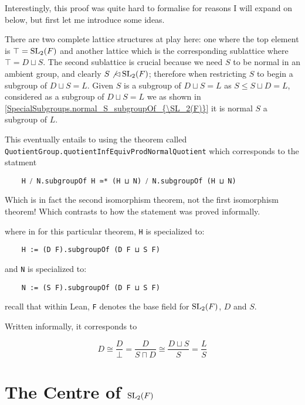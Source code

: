 \begin{remark}
Interestingly, this proof was quite hard to formalise for reasons I will expand on below, but first let me introduce some ideas.

There are two complete lattice structures at play here: one where the top element is $\top = \operatorname{SL}_2(F)$ and another lattice which is the corresponding sublattice where $\top = D \sqcup S$.
The second sublattice is crucial because we need $S$ to be normal in an ambient group, and clearly $S \not\lhd \operatorname{SL}_2(F)$; therefore when restricting $S$ to begin a subgroup of $D \sqcup S = L$. Given $S$ is a subgroup of $D \sqcup S = L$ as $S \le S\sqcup D = L$, considered as a subgroup of $D \sqcup S = L$ we as shown in \ref{SpecialSubgroups.normal_S_subgroupOf_{\SL_2(F)}}
it is normal $S$ a subgroup of $L$.

This eventually entails to using the theorem called \texttt{QuotientGroup.quotientInfEquivProdNormalQuotient} which corresponds to the statment

\begin{verbatim}
    H ⧸ N.subgroupOf H ≃* (H ⊔ N) ⧸ N.subgroupOf (H ⊔ N)
\end{verbatim}

Which is in fact the second isomorphism theorem, not the first isomorphism theorem! Which contrasts to how the statement was proved informally.

where in for this particular theorem, \texttt{H} is specialized to:

\begin{verbatim}
    H := (D F).subgroupOf (D F ⊔ S F)
\end{verbatim}

and  \texttt{N} is specialized to:

\begin{verbatim}
    N := (S F).subgroupOf (D F ⊔ S F)
\end{verbatim}

recall that within Lean, \texttt{F} denotes the base field for $\operatorname{SL}_2(F)$, $D$ and $S$.

Written informally, it corresponds to

\[
D \cong \frac{D}{\bot} = \frac{D}{S \sqcap D} \cong \frac{D \sqcup S}{S} = \frac{L}{S}
\]


\end{remark}

\section{The Centre of $\operatorname{SL}_2(F)$}

